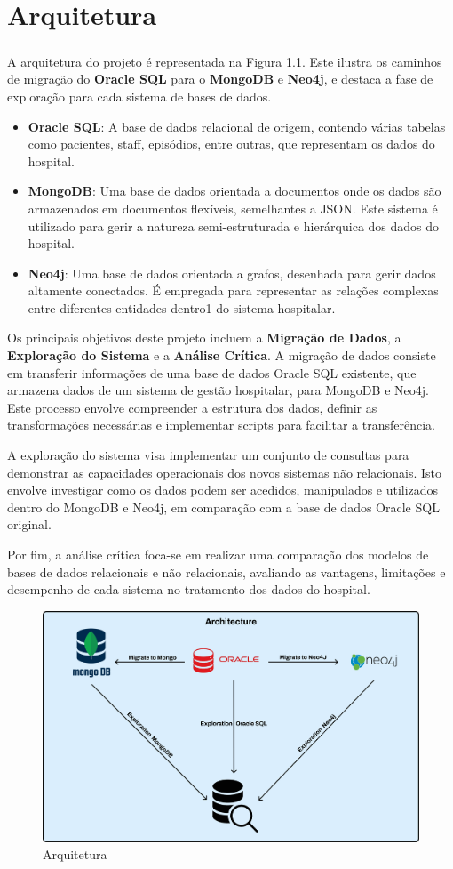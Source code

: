 \chapter{Arquitetura}
\paragraph{}

A arquitetura do projeto é representada na Figura \ref{fig:Arquitetura}. Este ilustra os caminhos de migração do \textbf{Oracle SQL} para o \textbf{MongoDB} e \textbf{Neo4j}, e destaca a fase de exploração para cada sistema de bases de dados.

\begin{itemize}
    \item \textbf{Oracle SQL}: A base de dados relacional de origem, contendo várias tabelas como pacientes, staff, episódios, entre outras, que representam os dados do hospital.
    \item \textbf{MongoDB}: Uma base de dados orientada a documentos onde os dados são armazenados em documentos flexíveis, semelhantes a JSON. Este sistema é utilizado para gerir a natureza semi-estruturada e hierárquica dos dados do hospital.
    \item \textbf{Neo4j}: Uma base de dados orientada a grafos, desenhada para gerir dados altamente conectados. É empregada para representar as relações complexas entre diferentes entidades dentro1 do sistema hospitalar.
\end{itemize}

Os principais objetivos deste projeto incluem a \textbf{Migração de Dados}, a \textbf{Exploração do Sistema} e a \textbf{Análise Crítica}. A migração de dados consiste em transferir informações de uma base de dados Oracle SQL existente, que armazena dados de um sistema de gestão hospitalar, para MongoDB e Neo4j. Este processo envolve compreender a estrutura dos dados, definir as transformações necessárias e implementar scripts para facilitar a transferência.

A exploração do sistema visa implementar um conjunto de consultas para demonstrar as capacidades operacionais dos novos sistemas não relacionais. Isto envolve investigar como os dados podem ser acedidos, manipulados e utilizados dentro do MongoDB e Neo4j, em comparação com a base de dados Oracle SQL original.

Por fim, a análise crítica foca-se em realizar uma comparação dos modelos de bases de dados relacionais e não relacionais, avaliando as vantagens, limitações e desempenho de cada sistema no tratamento dos dados do hospital.

\begin{figure}[H]
    \centering
    \includegraphics[width=0.8\linewidth]{Imagens/arquitetura.png}
    \caption{Arquitetura}
    \label{fig:Arquitetura}
\end{figure}

